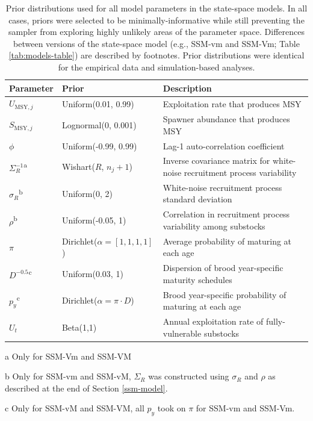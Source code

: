 \documentclass[12pt,]{book}
\theoremstyle{definition}
\theoremstyle{definition}
\theoremstyle{definition}
\theoremstyle{remark}
\begin{document}
\begin{table}

\caption{\label{tab:ssm-prior-table}Prior distributions used for all model parameters in the state-space models. In all cases, priors were selected to be minimally-informative while still preventing the sampler from exploring highly unlikely areas of the parameter space. Differences between versions of the state-space model (e.g., SSM-vm and SSM-Vm; Table \ref{tab:models-table}) are described by footnotes. Prior distributions were identical for the empirical data and simulation-based analyses.}
\centering
\begin{threeparttable}
\begin{tabular}[t]{ll>{\raggedright\arraybackslash}p{20em}}
\toprule
\textbf{Parameter} & \textbf{Prior} & \textbf{Description}\\
\midrule
$U_{\text{MSY},j}$ & Uniform(0.01, 0.99) & Exploitation rate that produces MSY\\
$S_{\text{MSY},j}$ & Lognormal(0, 0.001) & Spawner abundance that produces MSY\\
$\phi$ & Uniform(-0.99, 0.99) & Lag-1 auto-correlation coefficient\\
$\Sigma^{-1}_R$\textsuperscript{a} & Wishart($R$, $n_j+1$) & Inverse covariance matrix for white-noise recruitment process variability\\
$\sigma_R$\textsuperscript{b} & Uniform(0, 2) & White-noise recruitment process standard deviation\\
$\rho$\textsuperscript{b} & Uniform(-0.05, 1) & Correlation in recruitment process variability among substocks\\
$\pi$ & Dirichlet($\alpha = [1,1,1,1]$) & Average probability of maturing at each age\\
$D^{-0.5}$\textsuperscript{c} & Uniform(0.03, 1) & Dispersion of brood year-specific maturity schedules\\
$p_y$\textsuperscript{c} & Dirichlet($\alpha = \pi \cdot D$) & Brood year-specific probability of maturing at each age\\
$U_t$ & Beta(1,1) & Annual exploitation rate of fully-vulnerable substocks\\
\bottomrule
\end{tabular}
\begin{tablenotes}
\item[a] Only for SSM-Vm and SSM-VM
\item[b] Only for SSM-vm and SSM-vM, $\Sigma_R$ was constructed using $\sigma_R$ and $\rho$ as described at the end of Section \ref{ssm-model}.
\item[c] Only for SSM-vM and SSM-VM, all $p_y$ took on $\pi$ for SSM-vm and SSM-Vm.
\end{tablenotes}
\end{threeparttable}
\end{table}
\end{document}
